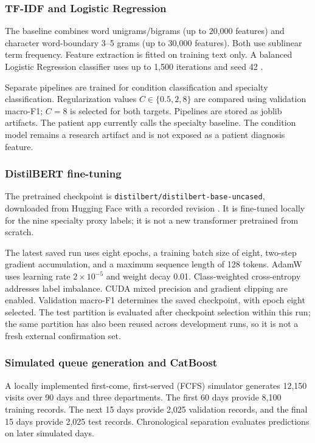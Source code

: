 \documentclass{tietreport}
\begin{document}
\subsubsection{TF-IDF and Logistic Regression}
The baseline combines word unigrams/bigrams (up to 20,000 features) and character word-boundary 3--5 grams (up to 30,000 features). Both use sublinear term frequency. Feature extraction is fitted on training text only. A balanced Logistic Regression classifier uses up to 1,500 iterations and seed 42 \cite{sklearn}.

Separate pipelines are trained for condition classification and specialty classification. Regularization values $C\in\{0.5,2,8\}$ are compared using validation macro-F1; $C=8$ is selected for both targets. Pipelines are stored as joblib artifacts. The patient app currently calls the specialty baseline. The condition model remains a research artifact and is not exposed as a patient diagnosis feature.

\subsubsection{DistilBERT fine-tuning}
The pretrained checkpoint is \texttt{distilbert/distilbert-base-uncased}, downloaded from Hugging Face with a recorded revision \cite{distilbert}. It is fine-tuned locally for the nine specialty proxy labels; it is not a new transformer pretrained from scratch.

The latest saved run uses eight epochs, a training batch size of eight, two-step gradient accumulation, and a maximum sequence length of 128 tokens. AdamW uses learning rate $2\times10^{-5}$ and weight decay 0.01. Class-weighted cross-entropy addresses label imbalance. CUDA mixed precision and gradient clipping are enabled. Validation macro-F1 determines the saved checkpoint, with epoch eight selected. The test partition is evaluated after checkpoint selection within this run; the same partition has also been reused across development runs, so it is not a fresh external confirmation set.

\subsubsection{Simulated queue generation and CatBoost}
A locally implemented first-come, first-served (FCFS) simulator generates 12,150 visits over 90 days and three departments. The first 60 days provide 8,100 training records. The next 15 days provide 2,025 validation records, and the final 15 days provide 2,025 test records. Chronological separation evaluates predictions on later simulated days.
\end{document}

